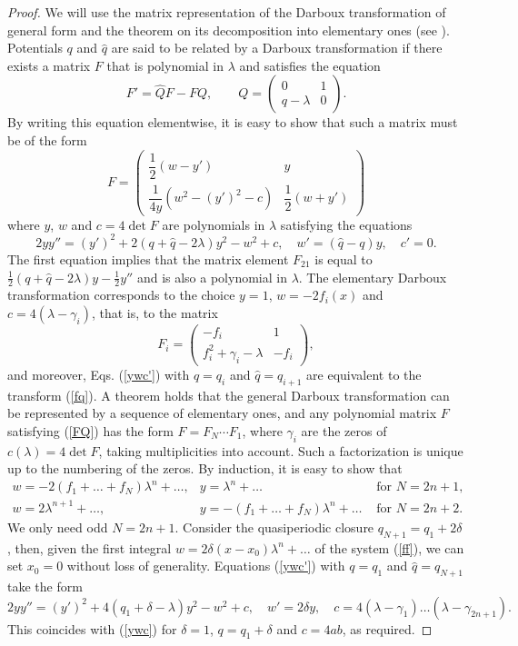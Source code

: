 \documentclass[11pt]{article}
\theoremstyle{plain}
\theoremstyle{definition}
\begin{document}
\begin{proof}
We will use the matrix representation of the Darboux transformation of general form and the theorem on its decomposition into elementary ones (see \cite{Veselov_Shabat_1993}). Potentials $q$ and $\hat q$ are said to be related by a Darboux transformation if there exists a matrix $F$ that is polynomial in $\lambda$ and satisfies the equation
\begin{equation}\label{FQ}
 F'=\widehat QF-FQ,\qquad Q=\begin{pmatrix} 0 & 1 \\ q-\lambda & 0 \end{pmatrix}.
\end{equation}
By writing this equation elementwise, it is easy to show that such a matrix must be of the form
\[
 F=\begin{pmatrix} 
    \dfrac{1}{2}(w-y') & y \\ 
    \dfrac{1}{4y}(w^2-(y')^2-c) & \dfrac{1}{2}(w+y') 
   \end{pmatrix}
\]
where $y$, $w$ and $c=4\det F$ are polynomials in $\lambda$ satisfying the equations
\begin{equation}\label{ywc'}
 2yy''=(y')^2+2(q+\hat q-2\lambda)y^2-w^2+c,\quad w'=(\hat q-q)y,\quad c'=0.
\end{equation}
The first equation implies that the matrix element $F_{21}$ is equal to $\frac{1}{2}(q+\hat q-2\lambda)y-\frac{1}{2}y''$ and is also a polynomial in $\lambda$. The elementary Darboux transformation corresponds to the choice $y=1$, $w=-2f_i(x)$ and $c=4(\lambda-\gamma_i)$, that is, to the matrix
\[
 F_i=\begin{pmatrix} 
    -f_i & 1 \\ 
    f^2_i+\gamma_i-\lambda & -f_i 
   \end{pmatrix},
\]
and moreover, Eqs. (\ref{ywc'}) with $q=q_i$ and $\hat q=q_{i+1}$ are equivalent to the transform (\ref{fq}). A theorem holds that the general Darboux transformation can be represented by a sequence of elementary ones, and any polynomial matrix $F$ satisfying (\ref{FQ}) has the form $F=F_N\cdots F_1$, where $\gamma_i$ are the zeros of $c(\lambda)=4\det F$, taking multiplicities into account. Such a factorization is unique up to the numbering of the zeros. By induction, it is easy to show that
\[
\begin{array}{lll}
 w=-2(f_1+\dots+f_N)\lambda^n+\dotsc,& y=\lambda^n+\dots &\text{ for } N=2n+1,\\
 w=2\lambda^{n+1}+\dotsc, & y= -(f_1+\dots+f_N)\lambda^n+\dots &\text{ for } N=2n+2.
\end{array}
\]
We only need odd $N=2n+1$. Consider the quasiperiodic closure $q_{N+1}=q_1+2\delta$, then, given the first integral $w=2\delta(x-x_0)\lambda^n+\dotsc$ of the system (\ref{ff}), we can set $x_0=0$ without loss of generality. Equations (\ref{ywc'}) with $q=q_1$ and $\hat q=q_{N+1}$ take the form
\[
 2yy''=(y')^2+4(q_1+\delta-\lambda)y^2-w^2+c,\quad 
 w'=2\delta y,\quad 
 c=4(\lambda-\gamma_1)\dots(\lambda-\gamma_{2n+1}).
\]
This coincides with (\ref{ywc}) for $\delta=1$, $q=q_1+\delta$ and $c=4ab$, as required.
\end{proof}
\end{document}
